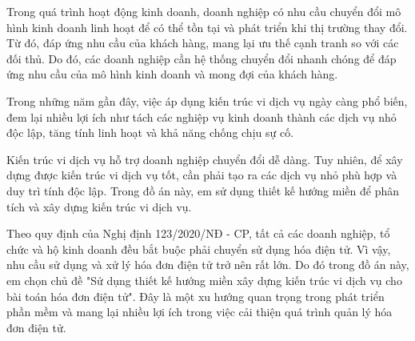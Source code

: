Trong quá trình hoạt động kinh doanh, doanh nghiệp có nhu cầu chuyển đổi mô hình kinh doanh linh hoạt để có thể tồn tại và phát triển khi thị trường thay đổi. Từ đó, đáp ứng nhu cầu của khách hàng, mang lại ưu thế cạnh tranh so với các đối thủ. Do đó, các doanh nghiệp cần hệ thống chuyển đổi nhanh chóng để đáp ứng nhu cầu của mô hình kinh doanh và mong đợi của khách hàng.

Trong những năm gần đây, việc áp dụng kiến trúc vi dịch vụ ngày càng phổ biến, đem lại nhiều lợi ích như tách các nghiệp vụ kinh doanh thành các dịch vụ nhỏ độc lập, tăng tính linh hoạt và khả năng chống chịu sự cố.

Kiến trúc vi dịch vụ hỗ trợ doanh nghiệp chuyển đổi dễ dàng. Tuy nhiên, để xây dựng được kiến trúc vi dịch vụ tốt, cần phải tạo ra các dịch vụ nhỏ phù hợp và duy trì tính độc lập. Trong đồ án này, em sử dụng thiết kế hướng miền để phân tích và xây dựng kiến trúc vi dịch vụ.

 Theo quy định của  Nghị định 123/2020/NĐ - CP, tất cả các doanh nghiệp, tổ chức và hộ kinh doanh đều bắt buộc phải chuyển   sử dụng hóa   điện tử. Vì vậy, nhu cầu sử dụng và xử lý hóa đơn điện tử trở nên rất lớn. Do đó trong đồ án này, em chọn chủ đề  "Sử dụng thiết kế hướng miền  xây dựng kiến trúc vi dịch vụ cho  bài toán hóa đơn điện tử". Đây  là một xu hướng quan trọng trong phát triển phần mềm và     mang lại nhiều lợi ích trong việc cải thiện quá trình quản lý hóa đơn điện tử.